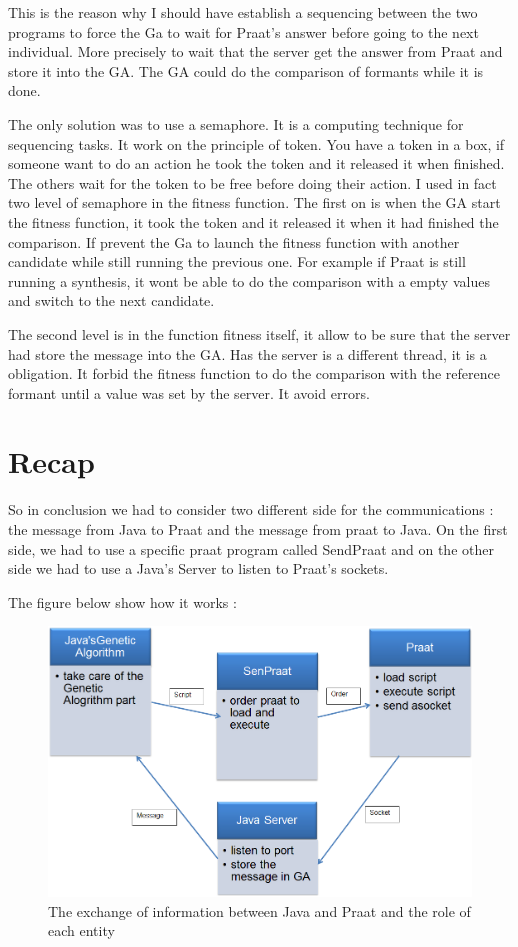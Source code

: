 \documentclass[12pt]{report}
\begin{document}
This is the reason why I should have establish a sequencing between the two programs to force the Ga to wait for Praat's answer before going to the next individual. More precisely to wait that the server get the answer from Praat and store it into the GA. The GA could do the comparison of formants while it is done.

The only solution was to use a semaphore. It is a computing technique for sequencing tasks. It work on the principle of token. You have a token in a box, if someone want to do an action he took the token and it released it when finished. The others wait for the token to be free before doing their action.
I used in fact two level of semaphore in the fitness function.
The first on is when the GA start the fitness function, it took the token and it released it when it had finished the comparison. If prevent the Ga to launch the fitness function with another candidate while still running the previous one. For example if Praat is still running a synthesis, it wont be able to do the comparison with a empty values and switch to the next candidate.

The second level is in the function fitness itself, it allow to be sure that the server had store the message into the GA. Has the server is a different thread, it is a obligation. It forbid the fitness function to do the comparison with the reference formant until a value was set by the server. It avoid errors.


\section{Recap}
So in conclusion we had to consider two different side for the communications : the message from Java to Praat and the message from praat to Java. On the first side, we had to use a specific praat program called SendPraat and on the other side we had to use a Java's Server to listen to Praat's sockets.

The figure below show how it works :
\begin{figure}
\begin{center}
\includegraphics[scale=0.6]{resources/architecture.png} 
\end{center}
\caption{The exchange of information between Java and Praat and the role of each entity}
\label{architecture}
\end{figure}
\end{document}
